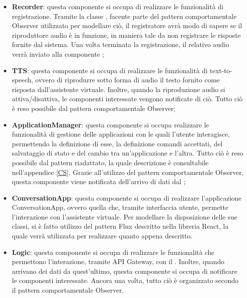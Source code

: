 \begin{itemize}
	\item \textbf{Recorder}: questa componente si occupa di realizzare le funzionalità di registrazione. Tramite la classe , facente parte del pattern comportamentale Observer utilizzato per modellare ciò, il registratore avrà modo di sapere se il riproduttore audio è in funzione, in maniera tale da non registrare le risposte fornite dal sistema. Una volta terminata la registrazione, il relativo audio verrà inviato alla componente ;
	\newpage
	\item \textbf{TTS}: questa componente si occupa di realizzare le funzionalità di text-to-speech, ovvero di riprodurre sotto forma di audio il testo fornito come risposta dall'assistente virtuale. Inoltre, quando la riproduzione audio si attiva/disattiva, le componenti interessate vengono notificate di ciò. Tutto ciò è reso possibile dal pattern comportamentale Observer;
	\item \textbf{ApplicationManager}: questa componente si occupa realizzare le funzionalità di gestione delle applicazioni con le quali l'utente interagisce, permettendo la definizione di esse, la definizione comandi accettati, del salvataggio di stato e del cambio tra un'applicazione e l'altra. Tutto ciò è reso possibile dal pattern  riadattato, la quale descrizione è consultabile nell'appendice \ref{CS}. Grazie all'utilizzo del pattern comportamentale Observer, questa componente viene notificata dell'arrivo di dati dal ;
	\item \textbf{ConversationApp}: questa componente si occupa di realizzare l'applicazione ConversationApp, ovvero quella che, tramite interfaccia utente, permette l'interazione con l'assistente virtuale. Per modellare la disposizione delle sue classi, si è fatto utilizzo del pattern Flux descritto nella libreria React, la quale verrà utilizzata per realizzare quanto appena descritto. 
	\item \textbf{Logic}: questa componente si occupa di realizzare le funzionalità che permettono l'interazione, tramite API Gateway, con il . Inoltre, quando arrivano dei dati da quest'ultimo, questa componente si occupa di notificare le componenti interessate. Ancora una volta, tutto ciò è organizzato secondo il pattern comportamentale Observer.
\end{itemize}
